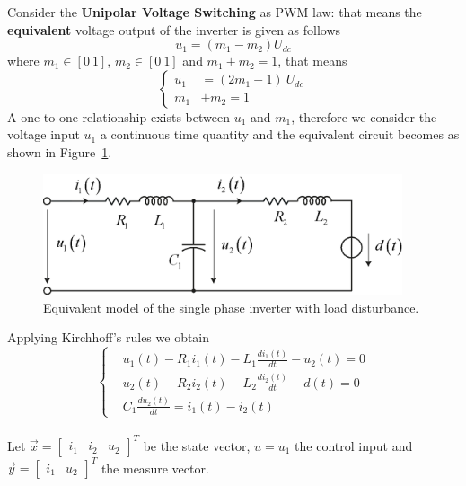 \documentclass[11pt,a4paper,oneside]{book}
\numberwithin{equation}{section}
\theoremstyle{it}
\theoremstyle{definition}
\begin{document}
Consider the \textbf{Unipolar Voltage Switching} as PWM law: that means the 
\textbf{equivalent} voltage output of the inverter is given as follows
\begin{equation*}
	u_1 = (m_1-m_2)U_{dc}
\end{equation*}
where $m_1 \in\left[0\ 1\right]$, $m_2 \in\left[0\ 1\right]$ and $m_1 + m_2 = 
1$, that means
\begin{equation*}
	\left\lbrace 
	\begin{aligned}
		u_1 &= (2m_1-1) \ U_{dc} \\
		m_1 &+ m_2 = 1 
	\end{aligned}
	\right. 
\end{equation*}
A one-to-one relationship exists between $u_1$ and $m_1$, therefore we consider 
the voltage input $u_1$ a continuous time quantity and the equivalent circuit 
becomes as shown in Figure~\ref{figure_eqsinglephaseinv}. 
\begin{figure}[H]
	\centering
	\includegraphics[width = 300pt,	keepaspectratio] 
	{figures/single_phase_inverter/single_phase_inverter_equi_plant.eps}
	\captionsetup{width=0.5\textwidth, font=small}		
	\caption{Equivalent model of the single phase inverter with load 
		disturbance.}
	\label{figure_eqsinglephaseinv}
\end{figure}
Applying Kirchhoff's rules we obtain
\begin{equation*}
	\left\lbrace 
	\begin{aligned}
		& u_1(t) - R_1i_1(t)-L_1\frac{di_1(t)}{dt}-u_2(t) = 0 \\[6pt]
		& u_2(t)- R_2i_2(t)-L_2\frac{di_2(t)}{dt}-d(t) = 0\\[6pt]
		& C_1 \frac{du_2(t)}{dt} = i_1(t)-i_2(t)
	\end{aligned}
	\right. 
\end{equation*}\\
Let $\vec{x}=\begin{bmatrix} i_1 & i_2 & u_2 \end{bmatrix}^T$ be the state 
vector, $u=u_1$ the control input and $\vec{y}=\begin{bmatrix} i_1 & u_2 
\end{bmatrix}^T$ the measure vector.\\
\end{document}
